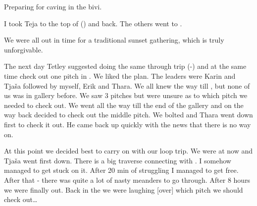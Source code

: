 \begin{pagefigure}
\checkoddpage \ifoddpage \forcerectofloat \else \forceversofloat \fi
{}
\caption{Preparing for caving in the bivi. }
\label{bivi cave prep}
\end{pagefigure}

I took Teja to the top of  () and back. The others went to
.

We were all out in time for a traditional sunset gathering, which is
truly unforgivable.

The next day Tetley suggested doing the same through trip
(-) and at the same time check out one pitch in .
We liked the plan. The leaders were Karin and Tjaša followed by myself,
Erik and Thara. We all knew the way till , but none of us
was in  gallery before. We saw 3 pitches but were unsure as to
which pitch we needed to check out. We went all the way till the end of
the gallery and on the way back decided to check out the middle pitch.
We bolted and Thara went down first to check it out. He came back up
quickly with the news that there is no way on.



At this point we decided
best to carry on with our loop trip. We were at  now and
Tjaša went first down. There is a big traverse connecting 
with . I somehow managed to get stuck on it. After 20 min of
struggling I managed to get free. After that  - there was quite
a lot of nasty meanders to go through. After 8 hours we were finally
out. Back in the  we were laughing [over] which pitch we should check
out\ldots{}

